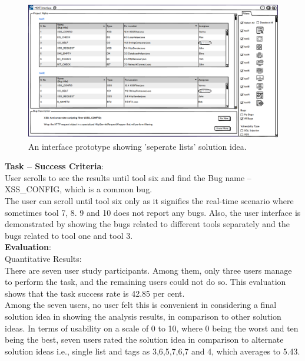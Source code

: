 \begin{figure}[hbt!]
	\centering
	\includegraphics[width=\linewidth]{figures/solution_ideas_snaps/S21_seperate_lists}
	\caption{An interface prototype showing 'seperate lists' solution idea.}
	\label{fig:S21_seperate_lists}
\end{figure}

\textbf{Task – Success Criteria}: \\

User scrolls to see the results until tool six and find the Bug name – XSS\_CONFIG, which is a common bug. \\

The user can scroll until tool six only as it signifies the real-time scenario where sometimes tool 7, 8. 9 and 10 does not report any bugs. Also, the user interface is demonstrated by showing the bugs related to different tools separately and the bugs related to tool one and tool 3. \\
\clearpage
\textbf{Evaluation}: \\

Quantitative Results: \\

There are seven user study participants. Among them, only three users manage to perform the task, and the remaining users could not do so. This evaluation shows that the task success rate is 42.85 per cent. \\

Among the seven users, no user felt this is convenient in considering a final solution idea in showing the analysis results, in comparison to other solution ideas. In terms of usability on a scale of 0 to 10, where 0 being the worst and ten being the best, seven users rated the solution idea in comparison to alternate solution ideas i.e., single list and tags as 3,6,5,7,6,7 and 4, which averages to 5.43. \\


